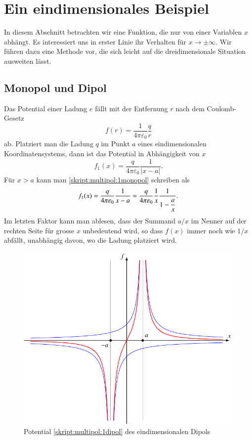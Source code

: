 %
%
%
\section{Ein eindimensionales Beispiel%
\label{skript:multipol:1dimbeispiel}}
In diesem Abschnitt betrachten wir eine Funktion, die nur von einer
Variablen $x$ abhängt.
Es interessiert uns in erster Linie ihr Verhalten 
für $x\to\pm\infty$.
Wir führen dazu eine Methode vor, die sich leicht auf die dreidimensionale
Situation ausweiten lässt.

\subsection{Monopol und Dipol}
Das Potential einer Ladung $e$ fällt mit der Entfernung $r$ nach dem
Coulomb-Gesetz
%
\[
f(r)=\frac1{4\pi\varepsilon_0}\frac{q}r
\]
ab.
Platziert man die Ladung $q$ im Punkt $a$ eines eindimensionalen
Koordinatensystems, dann ist das Potential in Abhängigkeit von $x$
\begin{equation}
f_1(x) = \frac{q}{4\pi\varepsilon_0} \frac1{|x-a|}.
\label{skript:multipol:1monopol}
\end{equation}
Für $x>a$ kann man \eqref{skript:multipol:1monopol} schreiben als
\begin{equation}
f_1(x)
=
\frac{q}{4\pi\varepsilon_0} \frac1{x-a}
=
\frac{q}{4\pi\varepsilon_0} \frac1x\frac1{1-\displaystyle\frac{a\mathstrut}{x}}.
\label{skript:multipol:1abfall}
\end{equation}
Im letzten Faktor kann man ablesen, dass der Summand $a/x$ im Nenner
auf der rechten Seite für grosse $x$ unbedeutend wird, so dass $f(x)$
immer noch wie $1/x$ abfällt, unabhängig davon, wo die Ladung platziert
wird.

\begin{figure}
\centering
\includegraphics{chapters/tikz/dipol1.pdf}
\caption{Potential
\eqref{skript:multipol:1dipol}
des eindimensionalen Dipols
\label{skript:multipol:figure:1dim}}
\end{figure}

